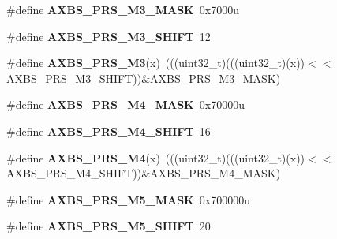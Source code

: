 \begin{DoxyCompactItemize}
\item 
\#define {\bfseries A\+X\+B\+S\+\_\+\+P\+R\+S\+\_\+\+M3\+\_\+\+M\+A\+SK}~0x7000u\hypertarget{group__AXBS__Register__Masks_gab4b4274fe732ec08377a17c98fcb3c89}{}\label{group__AXBS__Register__Masks_gab4b4274fe732ec08377a17c98fcb3c89}

\item 
\#define {\bfseries A\+X\+B\+S\+\_\+\+P\+R\+S\+\_\+\+M3\+\_\+\+S\+H\+I\+FT}~12\hypertarget{group__AXBS__Register__Masks_gaf63a98f7cff8ba76061096736d5fa14e}{}\label{group__AXBS__Register__Masks_gaf63a98f7cff8ba76061096736d5fa14e}

\item 
\#define {\bfseries A\+X\+B\+S\+\_\+\+P\+R\+S\+\_\+\+M3}(x)~(((uint32\+\_\+t)(((uint32\+\_\+t)(x))$<$$<$A\+X\+B\+S\+\_\+\+P\+R\+S\+\_\+\+M3\+\_\+\+S\+H\+I\+FT))\&A\+X\+B\+S\+\_\+\+P\+R\+S\+\_\+\+M3\+\_\+\+M\+A\+SK)\hypertarget{group__AXBS__Register__Masks_ga4bfe54e316bfb646da18888894d3bf53}{}\label{group__AXBS__Register__Masks_ga4bfe54e316bfb646da18888894d3bf53}

\item 
\#define {\bfseries A\+X\+B\+S\+\_\+\+P\+R\+S\+\_\+\+M4\+\_\+\+M\+A\+SK}~0x70000u\hypertarget{group__AXBS__Register__Masks_ga489c3dd8930bf3ada2f36146c4e3bc61}{}\label{group__AXBS__Register__Masks_ga489c3dd8930bf3ada2f36146c4e3bc61}

\item 
\#define {\bfseries A\+X\+B\+S\+\_\+\+P\+R\+S\+\_\+\+M4\+\_\+\+S\+H\+I\+FT}~16\hypertarget{group__AXBS__Register__Masks_gaa5c41d2e8da4620d83b63f9ffb3878cd}{}\label{group__AXBS__Register__Masks_gaa5c41d2e8da4620d83b63f9ffb3878cd}

\item 
\#define {\bfseries A\+X\+B\+S\+\_\+\+P\+R\+S\+\_\+\+M4}(x)~(((uint32\+\_\+t)(((uint32\+\_\+t)(x))$<$$<$A\+X\+B\+S\+\_\+\+P\+R\+S\+\_\+\+M4\+\_\+\+S\+H\+I\+FT))\&A\+X\+B\+S\+\_\+\+P\+R\+S\+\_\+\+M4\+\_\+\+M\+A\+SK)\hypertarget{group__AXBS__Register__Masks_ga637ca78f6d0fbd7625a0e14786664b44}{}\label{group__AXBS__Register__Masks_ga637ca78f6d0fbd7625a0e14786664b44}

\item 
\#define {\bfseries A\+X\+B\+S\+\_\+\+P\+R\+S\+\_\+\+M5\+\_\+\+M\+A\+SK}~0x700000u\hypertarget{group__AXBS__Register__Masks_ga6fe3afeef7171b168ddfa8341c88b0dc}{}\label{group__AXBS__Register__Masks_ga6fe3afeef7171b168ddfa8341c88b0dc}

\item 
\#define {\bfseries A\+X\+B\+S\+\_\+\+P\+R\+S\+\_\+\+M5\+\_\+\+S\+H\+I\+FT}~20\hypertarget{group__AXBS__Register__Masks_gabbebbaa7c8027c5ce2bfc3796cbdaac1}{}\label{group__AXBS__Register__Masks_gabbebbaa7c8027c5ce2bfc3796cbdaac1}


\end{DoxyCompactItemize}

